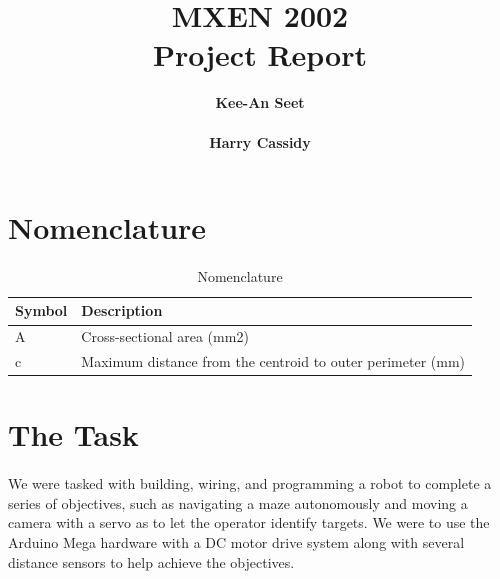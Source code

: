 \documentclass[12pt, a4paper]{article}
\title{
  \huge\textbf{MXEN 2002} \\
  \vspace{2em}
  \large\textbf{Project Report}\\
  \vspace{0.5em}
}
\author{
    \textbf{Kee-An Seet} \\
    \email{19776219@student.curtin.edu.au} \\
    \textbf{Harry Cassidy} \\
    \email{20607591@student.curtin.edu.au}
}
\date{}
\begin{document}
\maketitle
\pagebreak

\tableofcontents
\paragraph{}
\newpage
\listoffigures
\paragraph{}
\listoftables
\listofmyequations
\paragraph{}
\pagebreak


\section{Nomenclature}\label{sec:nomen}
\paragraph{}
\begin{table}[h]
    \centering
    \begin{tabular}{l|l}
      Symbol & Description~ \\ \hline \hline
      A & Cross-sectional area (mm2) \\ \hline
      c & Maximum distance from the centroid to outer perimeter (mm)      \\ \hline                          
    \end{tabular}
    \caption{Nomenclature}
    \label{tab:nome}
  \end{table}

\newpage
\section{The Task} \label{sec:intro}

\paragraph{}
  We were tasked with building, wiring, and programming a robot to complete a series of objectives, such as navigating a maze autonomously and moving a camera with a servo as to let the operator identify targets. We were to use the Arduino Mega hardware with a DC motor drive system along with several distance sensors to help achieve the objectives.
\end{document}
